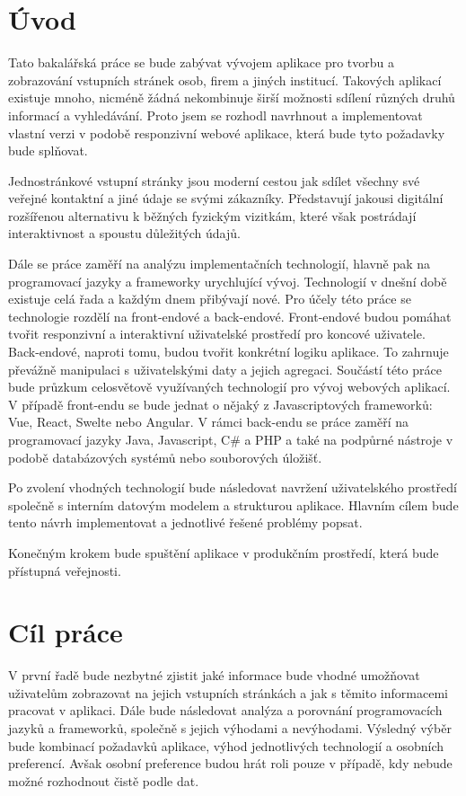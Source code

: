 \section{Úvod}

Tato bakalářská práce se bude zabývat vývojem aplikace pro tvorbu a zobrazování vstupních stránek osob, firem a jiných
institucí.
Takových aplikací existuje mnoho, nicméně žádná nekombinuje širší možnosti sdílení různých druhů informací a vyhledávání.
Proto jsem se rozhodl navrhnout a implementovat vlastní verzi v podobě responzivní webové aplikace, která bude
tyto požadavky bude splňovat.

Jednostránkové vstupní stránky jsou moderní cestou jak sdílet všechny své veřejné kontaktní a jiné údaje se
svými zákazníky.
Představují jakousi digitální rozšířenou alternativu k běžných fyzickým vizitkám, které však postrádají interaktivnost
a spoustu důležitých údajů.

Dále se práce zaměří na analýzu implementačních technologií, hlavně pak na programovací jazyky a frameworky urychlující vývoj.
Technologií v dnešní době existuje celá řada a každým dnem přibývají nové.
Pro účely této práce se technologie rozdělí na front-endové a back-endové.
Front-endové budou pomáhat tvořit responzivní a interaktivní uživatelské prostředí pro koncové uživatele.
Back-endové, naproti tomu, budou tvořit konkrétní logiku aplikace.
To zahrnuje převážně manipulaci s uživatelskými daty a jejich agregaci.
Součástí této práce bude průzkum celosvětově využívaných technologií pro vývoj webových aplikací.
V případě front-endu se bude jednat o nějaký z Javascriptových frameworků: Vue, React, Swelte nebo Angular.
V rámci back-endu se práce zaměří na programovací jazyky Java, Javascript, C\# a PHP a také na
podpůrné nástroje v podobě databázových systémů nebo souborových úložišť.

Po zvolení vhodných technologií bude následovat navržení uživatelského prostředí společně s interním
datovým modelem a strukturou aplikace.
Hlavním cílem bude tento návrh implementovat a jednotlivé řešené problémy popsat.

Konečným krokem bude spuštění aplikace v produkčním prostředí, která bude přístupná veřejnosti.

\section{Cíl práce}

V první řadě bude nezbytné zjistit jaké informace bude vhodné umožňovat uživatelům zobrazovat na jejich
vstupních stránkách a jak s těmito informacemi pracovat v aplikaci.
Dále bude následovat analýza a porovnání programovacích jazyků a frameworků, společně s jejich výhodami a nevýhodami.
Výsledný výběr bude kombinací požadavků aplikace, výhod jednotlivých technologií a osobních preferencí.
Avšak osobní preference budou hrát roli pouze v případě, kdy nebude možné rozhodnout čistě podle dat.

